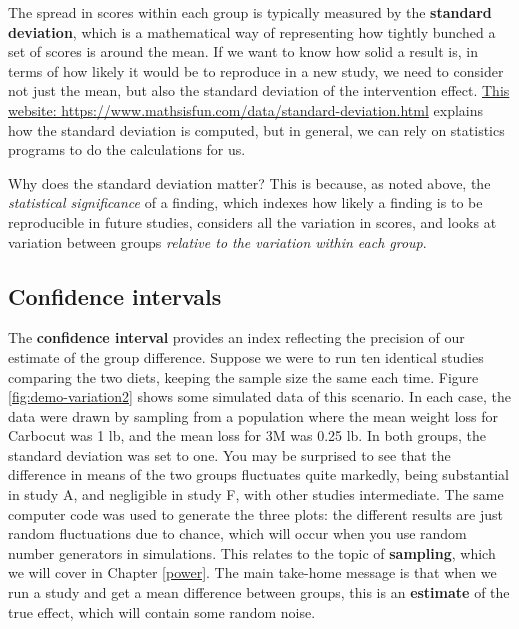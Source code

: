\documentclass{krantz}
\begin{document}
The spread in scores within each group is typically measured by the \textbf{standard deviation}, which is a mathematical way of representing how tightly bunched a set of scores is around the mean. If we want to know how solid a result is, in terms of how likely it would be to reproduce in a new study, we need to consider not just the mean, but also the standard deviation of the intervention effect. \href{https://www.mathsisfun.com/data/standard-deviation.html}{This website: https://www.mathsisfun.com/data/standard-deviation.html} explains how the standard deviation is computed, but in general, we can rely on statistics programs to do the calculations for us.

Why does the standard deviation matter? This is because, as noted above, the \emph{statistical significance} of a finding, which indexes how likely a finding is to be reproducible in future studies, considers all the variation in scores, and looks at variation between groups \emph{relative to the variation within each group}.

\hypertarget{confidence-intervals}{%
\subsection{Confidence intervals}\label{confidence-intervals}}

The \textbf{confidence interval}  provides an index reflecting the precision of our estimate of the group difference. Suppose we were to run ten identical studies comparing the two diets, keeping the sample size the same each time. Figure \ref{fig:demo-variation2} shows some simulated data of this scenario. In each case, the data were drawn by sampling from a population where the mean weight loss for Carbocut was 1 lb, and the mean loss for 3M was 0.25 lb. In both groups, the standard deviation was set to one. You may be surprised to see that the difference in means of the two groups fluctuates quite markedly, being substantial in study A, and negligible in study F, with other studies intermediate. The same computer code was used to generate the three plots: the different results are just random fluctuations due to chance, which will occur when you use random number generators in simulations. This relates to the topic of \textbf{sampling}, which we will cover in Chapter \ref{power}. The main take-home message is that when we run a study and get a mean difference between groups, this is an \textbf{estimate} of the true effect, which will contain some random noise.
\end{document}

